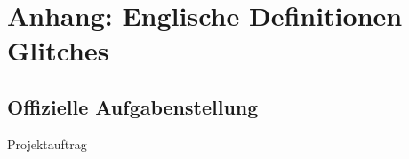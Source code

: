 


\appendix



\chapter{Anhang: Englische Definitionen Glitches}\label{chap.anhang_dictionaire}
 
 



\section{Offizielle Aufgabenstellung}\label{sect.verzeichnis_literatur}
Projektauftrag

